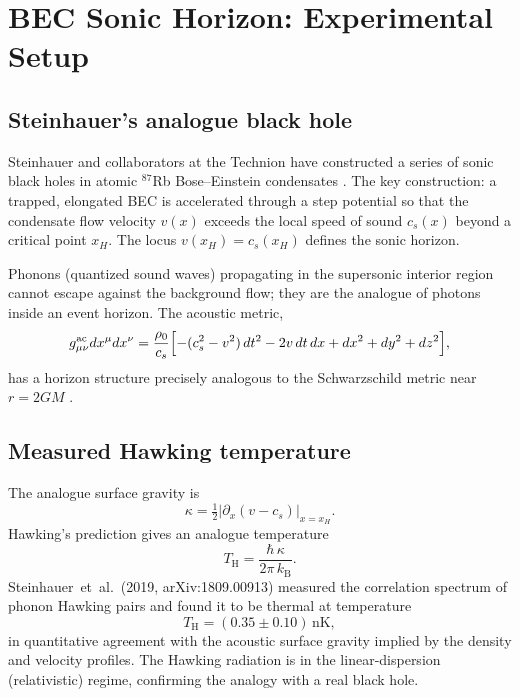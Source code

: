 \documentclass[12pt,a4paper]{article}
\renewcommand{\TH}{T_{\mathrm{H}}}
\newcommand{\kB}{k_{\mathrm{B}}}
\begin{document}
\tableofcontents
\bigskip

\section{BEC Sonic Horizon: Experimental Setup}
\label{sec:setup}

\subsection{Steinhauer's analogue black hole}

Steinhauer and collaborators at the Technion have constructed a series of
sonic black holes in atomic $^{87}$Rb Bose--Einstein condensates
\cite{steinhauer2016,steinhauer2019,kolobov2021}.
The key construction: a trapped, elongated BEC is accelerated through a
step potential so that the condensate flow velocity $v(x)$ exceeds the
local speed of sound $c_s(x)$ beyond a critical point $x_H$.
The locus $v(x_H) = c_s(x_H)$ defines the sonic horizon.

Phonons (quantized sound waves) propagating in the supersonic interior
region cannot escape against the background flow; they are the analogue of
photons inside an event horizon.
The acoustic metric,
\begin{equation}
  g_{\mu\nu}^{\mathrm{ac}} dx^\mu dx^\nu
  = \frac{\rho_0}{c_s}
    \Bigl[-(c_s^2 - v^2)\,dt^2 - 2v\,dt\,dx + dx^2 + dy^2 + dz^2\Bigr],
\end{equation}
has a horizon structure precisely analogous to the Schwarzschild metric
near $r = 2GM$ \cite{unruh1981,delhom2025}.

\subsection{Measured Hawking temperature}

The analogue surface gravity is
\begin{equation}
  \kappa = \tfrac{1}{2}\bigl|\partial_x(v - c_s)\bigr|_{x=x_H}.
\end{equation}
Hawking's prediction gives an analogue temperature
\begin{equation}
  \TH = \frac{\hbar\,\kappa}{2\pi\,\kB}.
\end{equation}
Steinhauer~et~al.\ (2019, arXiv:1809.00913) measured the correlation
spectrum of phonon Hawking pairs and found it to be thermal at temperature
\begin{equation}
  \TH = (0.35 \pm 0.10)\,\mathrm{nK},
  \label{eq:TH_measured}
\end{equation}
in quantitative agreement with the acoustic surface gravity implied by the
density and velocity profiles.
The Hawking radiation is in the linear-dispersion (relativistic) regime,
confirming the analogy with a real black hole.
\end{document}
